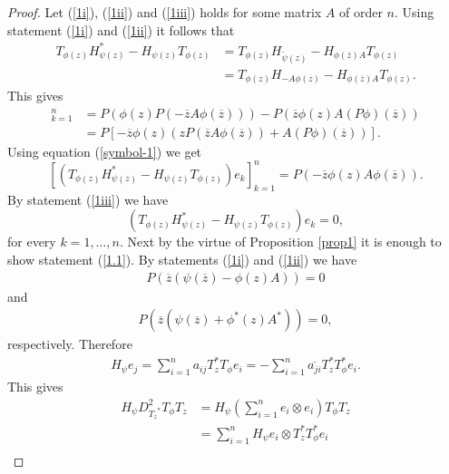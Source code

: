 \documentclass[12pt, reqno]{amsart}
\theoremstyle{definition}
\theoremstyle{remark}
\numberwithin{equation}{section}
\begin{document}
\begin{proof}
        Let (\ref{1i}), (\ref{1ii}) and (\ref{1iii}) holds for some matrix $A$ of order $n.$ Using statement (\ref{1i}) and (\ref{1ii}) it follows that
        \begin{align*}
                T_{\phi(z)} H^*_{\psi(z)}-H_{\psi(z)} T_{\phi(z)}&=T_{\phi(z)} H_{\tilde \psi(z)}-H_{\phi(\overline z)A}T_{\phi(z)}\\
                &=T_{\phi(z)} H_{-A\phi(z)}-H_{\phi(\overline z)A}T_{\phi(z)}.
        \end{align*}
         This gives
        \begin{align*}
                [(T_{\phi(z)} H^*_{\psi(z)}-H_{\psi(z)} T_{\phi(z)})e_k]_{k=1}^{n}&=
               P(\phi(z)P(-\overline z A \phi (\overline z)))-P(\overline{z}\phi(z)A(P\phi)(\overline z))\\
                &=P[-\overline z\phi(z)(zP(\overline z A\phi(\overline z))+A(P\phi)(\overline z))].
        \end{align*}
        Using equation (\ref{symbol-1}) we get
        \begin{equation}\label{Symbol comparison 1}
                [(T_{\phi(z)} H^*_{\psi(z)}-H_{\psi(z)} T_{\phi(z)})e_k]_{k=1}^{n}=P(-\overline z\phi(z)A\phi(\overline z)).
        \end{equation}
         By statement (\ref{1iii}) we have 
        $$ 
            (T_{\phi(z)} H^*_{\psi(z)}-H_{\psi(z)} T_{\phi(z)})e_k=0, 
        $$
        for every $k=1,\dots,n.$ Next by the virtue of Proposition \ref{prop1} it is enough to show statement (\ref{1.1}). By statements (\ref{1i}) and (\ref{1ii}) we have 
        \begin{align*}
            P(\overline z (\psi(\overline z)-\phi(z)A))=0
        \end{align*}
        and 
        \begin{align*}
            P(\overline z (\psi(\overline z)+\phi^*(z)A^*))=0,
        \end{align*}
        respectively. Therefore
        \begin{align*}
            H_\psi e_j = \sum_{i=1}^{n}a_{ij}T_z^*T_\phi e_i =-\sum_{i=1}^{n}\overline{a_{ji}}T^*_zT^*_\phi e_i.
        \end{align*}
        This gives 
        \begin{align*}
            H_\psi D^2_{{T_z}^*} T_\phi T_z &= H_\psi (\sum_{i=1}^{n} e_i\otimes e_i) {T_\phi}T_z\\
            &=\sum_{i=1}^{n}H_\psi e_i \otimes T_z^*T^*_\phi e_i\\

\end{align*}
\end{proof}
\end{document}
